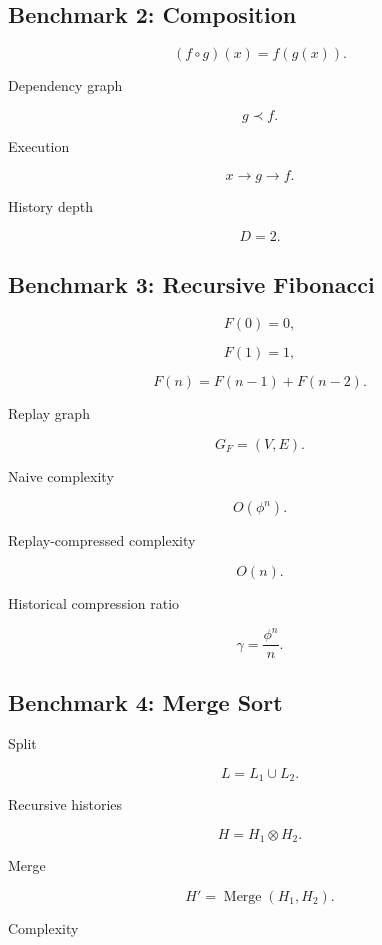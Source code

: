 \documentclass[12pt,oneside]{article}
\theoremstyle{definition}
\theoremstyle{remark}
\begin{document}
\subsection*{Benchmark 2: Composition}

\[
(f\circ g)(x)
=
f(g(x)).
\]

Dependency graph

\[
g
\prec
f.
\]

Execution

\[
x
\rightarrow
g
\rightarrow
f.
\]

History depth

\[
D=2.
\]

\subsection*{Benchmark 3: Recursive Fibonacci}

\[
F(0)=0,
\]

\[
F(1)=1,
\]

\[
F(n)
=
F(n-1)+F(n-2).
\]

Replay graph

\[
G_F
=
(V,E).
\]

Naive complexity

\[
O(\phi^n).
\]

Replay-compressed complexity

\[
O(n).
\]

Historical compression ratio

\[
\gamma
=
\frac{\phi^n}{n}.
\]

\subsection*{Benchmark 4: Merge Sort}

Split

\[
L
=
L_1
\cup
L_2.
\]

Recursive histories

\[
H
=
H_1
\otimes
H_2.
\]

Merge

\[
H'
=
\operatorname{Merge}(H_1,H_2).
\]

Complexity
\end{document}
